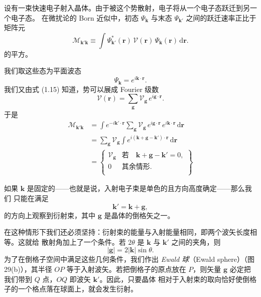 设有一束快速电子射入晶体。由于被这个势散射，电子将从一个电子态跃迁到另一个电子态。
在微扰论的 Born 近似中，初态 $\Psi_{\mathbf{k}}$ 与末态 $\Psi_{\mathbf{k}'}$
之间的跃迁速率正比于矩阵元
\begin{equation*}
\mathcal{M}_{\mathbf{k}'\mathbf{k}} \equiv \int \Psi_{\mathbf{k}'}^{*}(\mathbf{r})\,
\mathcal{V}(\mathbf{r})\, \Psi_{\mathbf{k}}(\mathbf{r})\, \mathrm{d}\mathbf{r}.
\tag{2.75}
\end{equation*}
的平方。

我们取这些态为平面波态
\begin{equation*}
\Psi_{\mathbf{k}} = e^{i\mathbf{k}\cdot\mathbf{r}}.
\tag{2.76}
\end{equation*}
我们又由式 (1.15) 知道，势可以展成 Fourier 级数
\begin{equation*}
\mathcal{V}(\mathbf{r}) = \sum_{\mathbf{g}} \mathcal{V}_{\mathbf{g}}\,
e^{i\mathbf{g}\cdot\mathbf{r}}.
\tag{2.77}
\end{equation*}
于是
\begin{align*}
\mathcal{M}_{\mathbf{k}'\mathbf{k}}
&= \int e^{-i\mathbf{k}'\cdot\mathbf{r}} \sum_{\mathbf{g}}
\mathcal{V}_{\mathbf{g}}\, e^{i\mathbf{g}\cdot\mathbf{r}}\,
e^{i\mathbf{k}\cdot\mathbf{r}}\, \mathrm{d}\mathbf{r} \\
&= \sum_{\mathbf{g}} \mathcal{V}_{\mathbf{g}} \int
e^{i(\mathbf{k}+\mathbf{g}-\mathbf{k}')\cdot\mathbf{r}}\, \mathrm{d}\mathbf{r} \\
&= \left\{ \begin{array}{ll}
\mathcal{V}_{\mathbf{g}} & \text{若}\quad \mathbf{k}+\mathbf{g}-\mathbf{k}' = 0, \\
0 & \text{其余情形}. \\
\end{array} \right\}
\tag{2.78}
\end{align*}

如果 $\mathbf{k}$ 是固定的——也就是说，入射电子束是单色的且方向高度确定——那么我们
只能在满足
\begin{equation*}
\mathbf{k}' = \mathbf{k} + \mathbf{g},
\tag{2.79}
\end{equation*}
的方向上观察到衍射束，其中 $\mathbf{g}$
是晶体的倒格矢之一。

在这种情形下我们还必须坚持：衍射束的能量与入射能量相同，即两个波矢长度相等。这就给
散射角加上了一个条件。若 $2\theta$ 是 $\mathbf{k}$ 与 $\mathbf{k}'$
之间的夹角，则
\begin{equation*}
|\mathbf{g}| = 2|\mathbf{k}|\sin\theta.
\tag{2.80}
\end{equation*}
为了在倒格子空间中满足这些几何条件，我们作出 \emph{Ewald 球}（Ewald
sphere）（图 29(b)），其半径 $OP$ 等于入射波矢。若把倒格子的原点放在 $P$，则矢量
$\mathbf{g}$ 必定把我们带到 $Q$ 点，$OQ$ 即波矢 $\mathbf{k}'$。因此，只要晶体
相对于入射束的取向恰好使倒格子的一个格点落在球面上，就会发生衍射。

